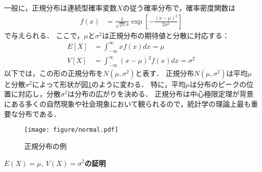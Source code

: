 %
一般に，正規分布は連続型確率変数$ X $の従う確率分布で，確率密度関数は
%
\begin{align}
	f(x) &= \frac{1}{\sqrt{2\pi} \sigma} \exp \left[ - \frac{(x-\mu)^{2}}{2\sigma^{2}} \right]
	\label{eq:normal}
\end{align}
%
で与えられる．
%
ここで，$ \mu $と$ \sigma^{2} $は正規分布の期待値と分散に対応する：
%
\begin{align*}
	E[X] &= \int_{-\infty}^{\infty} xf(x) dx = \mu \\
	V[X] &= \int_{-\infty}^{\infty} (x-\mu)^{2}f(x) dx = \sigma^{2}
\end{align*}
%
以下では，この形の正規分布を$ N(\mu,\sigma^{2}) $と表す．
%
正規分布$ N(\mu, \sigma^{2}) $は平均$ \mu $と分散$ \sigma^{2} $によって形状が図\ref{fig:normal}のように変わる．
%
特に，平均$ \mu $は分布のピークの位置に対応し，分散$ \sigma^{2} $は分布の広がりを決める．
%
正規分布は中心極限定理が背景にある多くの自然現象や社会現象において観られるので，統計学の理論上最も重要な分布である．
%

%
\begin{figure}[H]
	\centering
	\texttt{[image: figure/normal.pdf]}
	\caption{正規分布の例}
	\label{fig:normal}
\end{figure}
%

\clearpage
\noindent\textbf{$ E(X)=\mu,\ V(X)=\sigma^{2} $の証明}\\
\noindent\hrulefill

